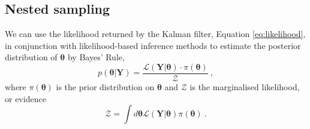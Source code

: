 \documentclass[fleqn,usenatbib,useAMS]{mnras}
\begin{document}


\subsection{Nested sampling}\label{sec:nested_sampling}
We can use the likelihood returned by the Kalman filter, Equation \eqref{eq:likelihood}, in conjunction with likelihood-based inference methods to estimate the posterior distribution of $\boldsymbol{\theta}$ by Bayes' Rule,
\begin{equation}
	p(\boldsymbol{\theta} | \boldsymbol{Y}) = \frac{\mathcal{L}(\boldsymbol{Y} | \boldsymbol{\theta}) \cdot \pi(\boldsymbol{\theta})}{\mathcal{Z}} \ ,
\end{equation}
where $\pi(\boldsymbol{\theta})$ is the prior distribution on $\boldsymbol{\theta}$ and $\mathcal{Z}$ is the marginalised likelihood, or evidence
\begin{equation}
	\mathcal{Z} = \int d \boldsymbol{\theta} \mathcal{L}(\boldsymbol{Y} | \boldsymbol{\theta})  \pi(\boldsymbol{\theta})  \ . \label{eq:model_evidence}
\end{equation}
\end{document}
